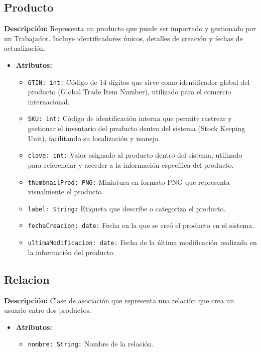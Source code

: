 \documentclass[12pt.a4paper]{article}
\begin{document}
\subsection{Producto}
\textbf{Descripción:} Representa un producto que puede ser importado y gestionado por un Trabajador. Incluye identificadores únicos, detalles de creación y fechas de actualización.
    \begin{itemize}
        \item {\textbf{Atributos:}}
        \begin{itemize}
            \item \texttt{GTIN: int:} Código de 14 dígitos que sirve como identificador global del producto (Global Trade Item Number), utilizado para el comercio internacional.
            \item \texttt{SKU: int:} Código de identificación interna que permite rastrear y gestionar el inventario del producto dentro del sistema (Stock Keeping Unit), facilitando su localización y manejo.
            \item \texttt{clave: int:} Valor asignado al producto dentro del sistema, utilizado para referenciar y acceder a la información específica del producto.
            \item \texttt{thumbnailProd: PNG:} Miniatura en formato PNG que representa visualmente el producto.
            \item \texttt{label: String:} Etiqueta que describe o categoriza el producto.
            \item \texttt{fechaCreacion: date:} Fecha en la que se creó el producto en el sistema.
            \item \texttt{ultimaModificacion: date:} Fecha de la última modificación realizada en la información del producto.
        \end{itemize}
    \end{itemize}

\subsection{Relacion}
\textbf{Descripción:} Clase de asociación que representa una relación que crea un usuario entre dos productos.
    \begin{itemize}
        \item {\textbf{Atributos:}}
        \begin{itemize}
            \item \texttt{nombre: String:} Nombre de la relación.
        \end{itemize}
    \end{itemize}
\end{document}
